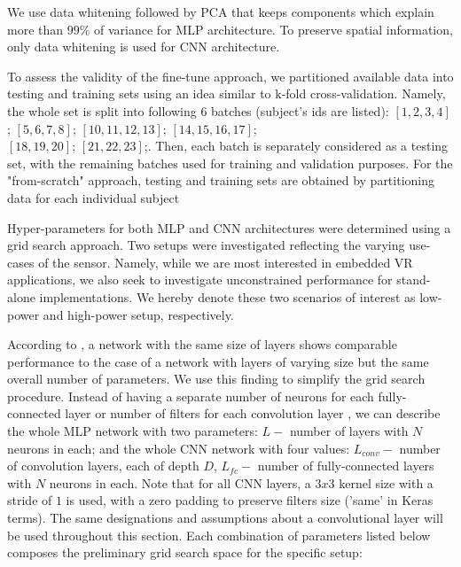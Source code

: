 We use data whitening followed by PCA that keeps components which explain more than $99$\% of variance for MLP architecture. To preserve spatial information, only data whitening is used for CNN architecture.  

To assess the validity of the fine-tune approach, we partitioned available data into testing and training sets using an idea similar to k-fold cross-validation. Namely, the whole set is split into following 6 batches (subject's ids are listed): $[1,2,3,4]$; $[5,6,7,8]$; $[10,11,12,13]$; $[14,15,16,17]$; \\ $[18,19,20]$; $[21,22,23]$;. Then, each batch is separately considered as a testing set, with the remaining batches used for training and validation purposes. For the "from-scratch" approach, testing and training sets are obtained by partitioning data for each individual subject 

Hyper-parameters for both MLP and CNN architectures were determined using a grid search approach. Two setups  were investigated reflecting the varying use-cases of the sensor. Namely, while we are most interested in embedded VR applications, we also seek to investigate unconstrained performance for stand-alone implementations. We hereby denote these two scenarios of interest as low-power and high-power setup, respectively. 

According to \cite{bengio2012practical}, a network with the same size of layers   shows comparable performance to the case of a network with layers of varying size  but the same overall number of parameters. We use this finding to simplify the grid search procedure. Instead of having a separate number of neurons for each fully-connected layer or number of filters for each convolution layer  , we can describe the whole MLP network with two parameters: $L - $ number of layers with $N$ neurons in each; and the whole CNN network with four values: $L_{conv} - $ number of convolution layers, each of depth $D$, $L_{fc} - $ number of fully-connected layers with $N$ neurons in each. Note that for all CNN layers, a $3x3$ kernel size with a stride of $1$ is used, with a zero padding to preserve filters size ('same' in Keras terms). The same designations and assumptions about a convolutional layer will be used throughout this section. Each combination of parameters listed below composes the preliminary grid search space for the specific setup:

